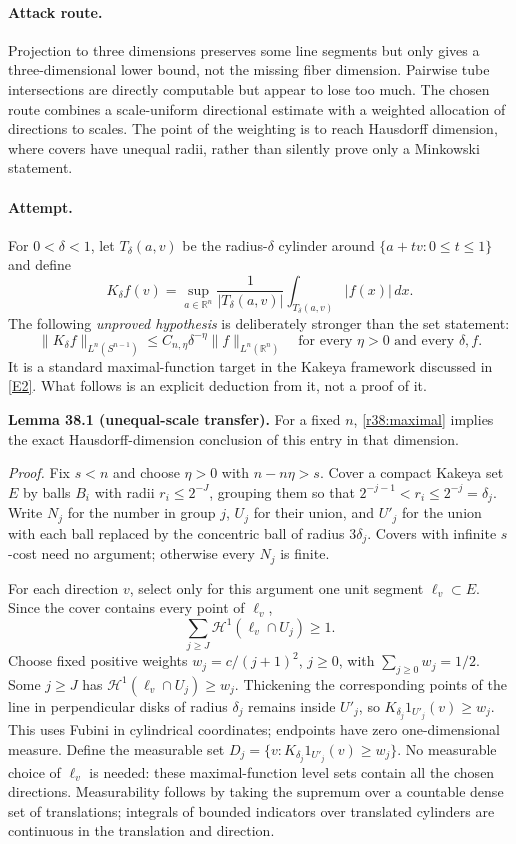\documentclass[11pt,a4paper]{article}
\newcommand{\R}{\mathbb{R}}
\newcommand{\eref}[2]{\hyperlink{extra:#1:#2}{[E#2]}}
\numberwithin{equation}{section}
\begin{document}
\paragraph{Attack route.}
Projection to three dimensions preserves some line segments but only gives
a three-dimensional lower bound, not the missing fiber dimension. Pairwise
tube intersections are directly computable but appear to lose too much.
The chosen route combines a scale-uniform directional estimate with a
weighted allocation of directions to scales. The point of the weighting is
to reach Hausdorff dimension, where covers have unequal radii, rather than
silently prove only a Minkowski statement.

\paragraph{Attempt.}
For $0<\delta<1$, let $T_\delta(a,v)$ be the radius-$\delta$ cylinder around
$\{a+tv:0\le t\le1\}$ and define
\[
 K_\delta f(v)=\sup_{a\in\R^n}\frac1{|T_\delta(a,v)|}
                      \int_{T_\delta(a,v)}|f(x)|\,dx.
\]
The following \emph{unproved hypothesis} is deliberately stronger than the
set statement:
\begin{equation}\label{r38:maximal}
 \|K_\delta f\|_{L^n(S^{n-1})}
 \le C_{n,\eta}\delta^{-\eta}\|f\|_{L^n(\R^n)}
 \quad\text{for every }\eta>0\text{ and every }\delta,f.
\end{equation}
It is a standard maximal-function target in the Kakeya framework discussed
in \eref{statement}{2}. What follows is an explicit deduction from it, not a proof
of it.

\textbf{Lemma 38.1 (unequal-scale transfer).}
For a fixed $n$, \eqref{r38:maximal} implies the exact Hausdorff-dimension
conclusion of this entry in that dimension.

\emph{Proof.}
Fix $s<n$ and choose $\eta>0$ with $n-n\eta>s$. Cover a compact Kakeya set
$E$ by balls $B_i$ with radii $r_i\le2^{-J}$, grouping them so that
$2^{-j-1}<r_i\le2^{-j}=\delta_j$. Write $N_j$ for the number in group $j$,
$U_j$ for their union, and $U'_j$ for the union with each ball replaced by
the concentric ball of radius $3\delta_j$. Covers with infinite $s$-cost
need no argument; otherwise every $N_j$ is finite.

For each direction $v$, select only for this argument one unit segment
$\ell_v\subset E$. Since the cover contains every point of $\ell_v$,
\[
 \sum_{j\ge J}\mathcal H^1(\ell_v\cap U_j)\ge1.
\]
Choose fixed positive weights $w_j=c/(j+1)^2$, $j\ge0$, with
$\sum_{j\ge0}w_j=1/2$. Some $j\ge J$ has
$\mathcal H^1(\ell_v\cap U_j)\ge w_j$. Thickening the corresponding points
of the line in perpendicular disks of radius $\delta_j$ remains inside
$U'_j$, so $K_{\delta_j}1_{U'_j}(v)\ge w_j$. This uses Fubini in cylindrical
coordinates; endpoints have zero one-dimensional measure.
Define the measurable set
$D_j=\{v:K_{\delta_j}1_{U'_j}(v)\ge w_j\}$. No measurable choice of
$\ell_v$ is needed: these maximal-function level sets contain all the chosen
directions. Measurability follows by taking the supremum over a countable
dense set of translations; integrals of bounded indicators over translated
cylinders are continuous in the translation and direction.
\end{document}
